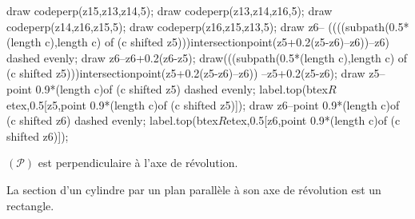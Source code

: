 \begin{propriete}
\begin{minipage}{0.5\linewidth}
\begin{center}
{\begin{Geometrie}[CoinBG={(-3u,-4u)},CoinHD={(6u,6u)}]
                draw codeperp(z15,z13,z14,5); draw codeperp(z13,z14,z16,5); draw codeperp(z14,z16,z15,5); draw codeperp(z16,z15,z13,5);
                draw z6-- ((((subpath(0.5*(length c),length c) of (c shifted z5)))intersectionpoint(z5+0.2(z5-z6)--z6))--z6) dashed evenly; draw z6--z6+0.2(z6-z5);
                draw(((subpath(0.5*(length c),length c) of (c shifted z5)))intersectionpoint(z5+0.2(z5-z6)--z6)) --z5+0.2(z5-z6);
                draw z5-- point 0.9*(length c)of (c shifted z5) dashed evenly; label.top(btex$R$etex,0.5[z5,point 0.9*(length c)of (c shifted z5)]);
                draw z6--point 0.9*(length c)of (c shifted z6) dashed evenly; label.top(btex$R$etex,0.5[z6,point 0.9*(length c)of (c shifted z6)]);
            \end{Geometrie}
            }
    
            $(\mathcal{P})$ est perpendiculaire à l'axe de révolution.
        \end{center}        
    \end{minipage}
    \begin{minipage}{0.5\linewidth}
        La section d'un cylindre par un plan parallèle à son axe de révolution est un rectangle.
    \end{minipage}
\end{propriete}

